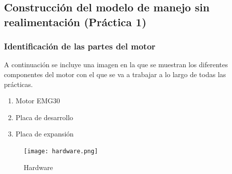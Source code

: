 \documentclass[a4paper, 12pt]{article}
\begin{document}
\subsection{Construcción del modelo de manejo sin realimentación (Práctica 1)} 
\subsubsection{Identificación de las partes del motor}
A continuación se incluye una imagen en la que se muestran los diferentes componentes del motor con el que se va a trabajar a lo largo de todas las prácticas.

\begin{enumerate}
	\item Motor EMG30
	\item Placa de desarrollo
	\item Placa de expansión
\end{enumerate}

\begin{figure}[h!]
	\centering
	\texttt{[image: hardware.png]}
	\caption{Hardware}
\end{figure}
\end{document}
